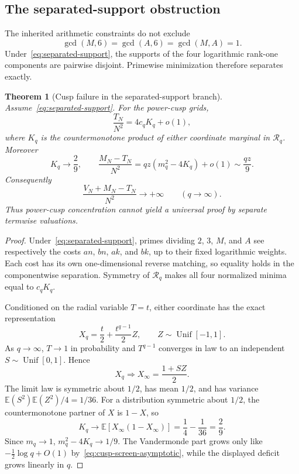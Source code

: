\documentclass[11pt]{article}
\newcommand{\E}{\mathbb E}
\newcommand{\1}{\mathbf 1}
\theoremstyle{plain}
\newtheorem{theorem}{Theorem}[section]
\theoremstyle{definition}
\theoremstyle{remark}
\begin{document}
\subsection{The separated-support obstruction}
\label{sec:cusp-obstruction}

The inherited arithmetic constraints do not exclude
\begin{equation}\label{eq:separated-support}
 \gcd(M,6)=\gcd(A,6)=\gcd(M,A)=1.
\end{equation}
Under~\eqref{eq:separated-support}, the supports of the four logarithmic
rank-one components are pairwise disjoint.  Primewise minimization therefore
separates exactly.

\begin{theorem}[Cusp failure in the separated-support branch]
\label{thm:cusp-separated}
Assume~\eqref{eq:separated-support}.  For the power-cusp grids,
\begin{equation}\label{eq:cusp-Tsep-limit}
 \frac{T_N}{N^2}=4c_qK_q+o(1),
\end{equation}
where $K_q$ is the countermonotone product of either coordinate marginal in
$\mathcal R_q$.  Moreover
\begin{equation}\label{eq:Kq-limit}
 K_q\longrightarrow\frac29,
 \qquad
 \frac{M_N-T_N}{N^2}
 =qz\left(m_q^2-4K_q\right)+o(1)
 \sim\frac{qz}{9}.
\end{equation}
Consequently
\[
 \frac{V_N+M_N-T_N}{N^2}\longrightarrow+\infty
 \qquad(q\to\infty).
\]
Thus power-cusp concentration cannot yield a universal proof by separate
termwise valuations.
\end{theorem}

\begin{proof}
Under~\eqref{eq:separated-support}, primes dividing $2$, $3$, $M$, and $A$
see respectively the costs $an$, $bn$, $ak$, and $bk$, up to their fixed
logarithmic weights.  Each cost has its own one-dimensional reverse matching,
so equality holds in the componentwise separation.  Symmetry of
$\mathcal R_q$ makes all four normalized minima equal to $c_qK_q$.

Conditioned on the radial variable $T=t$, either coordinate has the exact
representation
\begin{equation}\label{eq:cusp-coordinate}
 X_q=\frac t2+\frac{t^{q-1}}2Z,
 \qquad Z\sim\operatorname{Unif}[-1,1].
\end{equation}
As $q\to\infty$, $T\to1$ in probability and $T^{q-1}$ converges in law to an
independent $S\sim\operatorname{Unif}[0,1]$.  Hence
\[
 X_q\Longrightarrow X_\infty=\frac{1+SZ}{2}.
\]
The limit law is symmetric about $1/2$, has mean $1/2$, and has variance
$\E(S^2)\E(Z^2)/4=1/36$.  For a distribution symmetric about $1/2$, the
countermonotone partner of $X$ is $1-X$, so
\[
 K_q\longrightarrow\E[X_\infty(1-X_\infty)]
 =\frac14-\frac1{36}=\frac29.
\]
Since $m_q\to1$, $m_q^2-4K_q\to1/9$.  The Vandermonde part grows only like
$-\frac12\log q+O(1)$ by~\eqref{eq:cusp-screen-asymptotic}, while the displayed
deficit grows linearly in $q$.
\end{proof}
\end{document}
